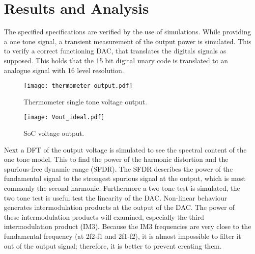\section{Results and Analysis}\label{sec:simulations}
The specified specifications are verified by the use of simulations. While providing a one tone signal, a transient measurement of the output power is simulated. This to verify a correct functioning DAC, that translates the digitals signals as supposed. This holds that the 15 bit digital unary code is translated to an analogue signal with 16 level resolution.

\begin{figure}[htp] 
\texttt{[image: thermometer\_output.pdf]}
\caption{Thermometer single tone voltage output.}
\label{fig:Thermometer}
\end{figure}

\begin{figure}[htp] 
\texttt{[image: Vout\_ideal.pdf]}
\caption{SoC voltage output.}
\label{fig:SoC Vout}
\end{figure}


Next a DFT of the output voltage is simulated to see the spectral content of the one tone model. This to find the power of the harmonic distortion and the spurious-free dynamic range (SFDR).  The SFDR describes the power of the fundamental signal to the strongest spurious signal at the output, which is most commonly the second harmonic. 
Furthermore a two tone test is simulated, the two tone test is useful test the linearity of the DAC. Non-linear behaviour generates intermodulation products at the output of the DAC. The power of these intermodulation products will examined, especially the third intermodulation product (IM3). Because the IM3 frequencies are very close to the fundamental frequency (at 2f2-f1 and 2f1-f2), it is almost impossible to filter it out of the output signal; therefore, it is better to prevent creating them. 